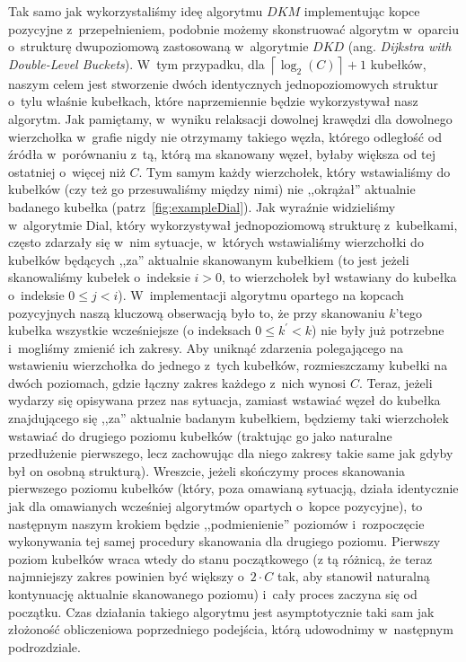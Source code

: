 Tak samo jak wykorzystaliśmy ideę algorytmu $DKM$ implementując kopce pozycyjne z~przepełnieniem, podobnie możemy skonstruować algorytm w~oparciu o~strukturę dwupoziomową zastosowaną w~algorytmie $DKD$ (ang. \textit{Dijkstra with Double-Level Buckets}).
W~tym przypadku, dla $\left \lceil \log_{2} \left( C \right) \right \rceil + 1$ kubełków, naszym celem jest stworzenie dwóch identycznych jednopoziomowych struktur o~tylu właśnie kubełkach, które naprzemiennie będzie wykorzystywał nasz algorytm.
Jak pamiętamy, w~wyniku relaksacji dowolnej krawędzi dla dowolnego wierzchołka w~grafie nigdy nie otrzymamy takiego węzła, którego odległość od źródła w~porównaniu z~tą, którą ma skanowany węzeł, byłaby większa od tej ostatniej o~więcej niż $C$.
Tym samym każdy wierzchołek, który wstawialiśmy do kubełków (czy też go przesuwaliśmy między nimi) nie ,,okrążał'' aktualnie badanego kubełka (patrz~\ref{fig:exampleDial}).
Jak wyraźnie widzieliśmy w~algorytmie Dial, który wykorzystywał jednopoziomową strukturę z~kubełkami, często zdarzały się w~nim sytuacje, w~których wstawialiśmy wierzchołki do kubełków będących ,,za'' aktualnie skanowanym kubełkiem (to jest jeżeli skanowaliśmy kubełek o~indeksie $i > 0$, to wierzchołek był wstawiany do kubełka o~indeksie $0 \leqslant j < i$).
W~implementacji algorytmu opartego na kopcach pozycyjnych naszą kluczową obserwacją było to, że przy skanowaniu $k$'tego kubełka wszystkie wcześniejsze (o indeksach $0 \leqslant k^{'} < k$) nie były już potrzebne i~mogliśmy zmienić ich zakresy.
Aby uniknąć zdarzenia polegającego na wstawieniu wierzchołka do jednego z~tych kubełków, rozmieszczamy kubełki na dwóch poziomach, gdzie łączny zakres każdego z~nich wynosi $C$.
Teraz, jeżeli wydarzy się opisywana przez nas sytuacja, zamiast wstawiać węzeł do kubełka znajdującego się ,,za'' aktualnie badanym kubełkiem, będziemy taki wierzchołek wstawiać do drugiego poziomu kubełków (traktując go jako naturalne przedłużenie pierwszego, lecz zachowując dla niego zakresy takie same jak gdyby był on osobną strukturą).
Wreszcie, jeżeli skończymy proces skanowania pierwszego poziomu kubełków (który, poza omawianą sytuacją, działa identycznie jak dla omawianych wcześniej algorytmów opartych o~kopce pozycyjne), to następnym naszym krokiem będzie ,,podmienienie'' poziomów i~rozpoczęcie wykonywania tej samej procedury skanowania dla drugiego poziomu.
Pierwszy poziom kubełków wraca wtedy do stanu początkowego (z tą różnicą, że teraz najmniejszy zakres powinien być większy o~$2 \cdot C$ tak, aby stanowił naturalną kontynuację aktualnie skanowanego poziomu) i~cały proces zaczyna się od początku.
Czas działania takiego algorytmu jest asymptotycznie taki sam jak złożoność obliczeniowa poprzedniego podejścia, którą udowodnimy w~następnym podrozdziale.


